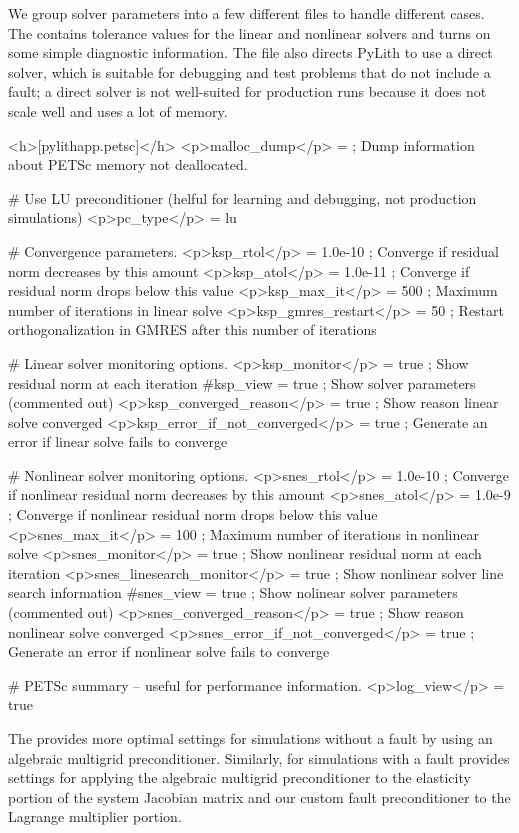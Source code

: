 We group solver parameters into a few different files to handle
different cases. The  contains tolerance
values for the linear and nonlinear solvers and turns on some simple
diagnostic information. The file also directs PyLith to use a direct
solver, which is suitable for debugging and test problems that do not
include a fault; a direct solver is not well-suited for production
runs because it does not scale well and uses a lot of memory.
\begin{cfg}
<h>[pylithapp.petsc]</h>
<p>malloc_dump</p> = ; Dump information about PETSc memory not deallocated.

# Use LU preconditioner (helful for learning and debugging, not production simulations)
<p>pc_type</p> = lu

# Convergence parameters.
<p>ksp_rtol</p> = 1.0e-10 ; Converge if residual norm decreases by this amount
<p>ksp_atol</p> = 1.0e-11 ; Converge if residual norm drops below this value
<p>ksp_max_it</p> = 500 ; Maximum number of iterations in linear solve
<p>ksp_gmres_restart</p> = 50 ; Restart orthogonalization in GMRES after this number of iterations

# Linear solver monitoring options.
<p>ksp_monitor</p> = true ; Show residual norm at each iteration
#ksp_view = true ; Show solver parameters (commented out)
<p>ksp_converged_reason</p> = true ; Show reason linear solve converged
<p>ksp_error_if_not_converged</p> = true ; Generate an error if linear solve fails to converge

# Nonlinear solver monitoring options.
<p>snes_rtol</p> = 1.0e-10 ; Converge if nonlinear residual norm decreases by this amount
<p>snes_atol</p> = 1.0e-9 ; Converge if nonlinear residual norm drops below this value
<p>snes_max_it</p> = 100 ; Maximum number of iterations in nonlinear solve
<p>snes_monitor</p> = true ; Show nonlinear residual norm at each iteration
<p>snes_linesearch_monitor</p> = true ; Show nonlinear solver line search information
#snes_view = true ; Show nolinear solver parameters (commented out)
<p>snes_converged_reason</p> = true ; Show reason nonlinear solve converged
<p>snes_error_if_not_converged</p> = true ; Generate an error if nonlinear solve fails to converge

# PETSc summary -- useful for performance information.
<p>log_view</p> = true
\end{cfg}

The
 provides more optimal
settings for simulations without a fault by using an algebraic
multigrid preconditioner. Similarly, for simulations with a fault
 provides settings for applying the
algebraic multigrid preconditioner to the elasticity portion of the
system Jacobian matrix and our custom fault preconditioner to the
Lagrange multiplier portion.

